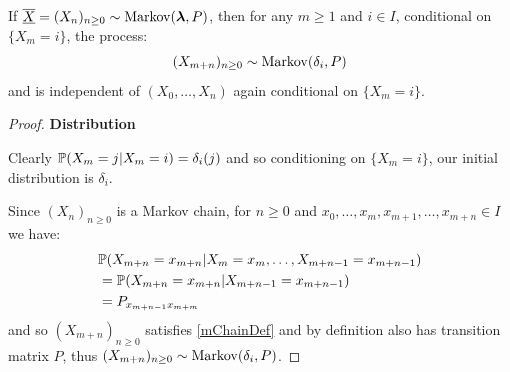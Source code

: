 \documentclass[../main.tex]{subfiles}
\begin{document}
\begin{theorem}\par
  If $\mchain{X} = (X_n)_{n \geq 0} \sim \markov(\vec{\lambda}, P)$, then for any $m \geq 1$ and $i \in I$, conditional on $\{X_m = i\}$, the process: \label{simpleMarkov}
  \[
    (X_{m + n})_{n \geq 0} \sim \markov(\delta_i, P)
  \]
  and is independent of $(X_0, \ldots, X_n)$ again conditional on $\{X_m = i\}$.
\end{theorem}
\begin{proof}\par
  \textbf{Distribution}\par
  Clearly $\P(X_m = j \vert X_m = i) = \delta_{i}(j)$ and so conditioning on $\{X_m = i\}$, our initial distribution is $\delta_i$.

  Since $(X_n)_{n \geq 0}$ is a Markov chain, for $n \geq 0$ and $x_0, \ldots, x_m, x_{m + 1}, \ldots, x_{m + n} \in I$ we have:
  \begin{align*}
    &\P(X_{m + n} = x_{m + n} \vert X_m = x_m, \ldots, X_{m + n -1} = x_{m + n - 1}) \\
    &= \P(X_{m + n} = x_{m + n} \vert X_{m + n - 1} = x_{m + n - 1}) \\
    &= P_{x_{m + n - 1} x_{m + m}}
  \end{align*}
  and so $(X_{m + n})_{n \geq 0}$ satisfies \cref{mChainDef} and by definition also has transition matrix $P$, thus $(X_{m + n})_{n \geq 0} \sim \markov(\delta_i, P)$.


\end{proof}
\end{document}
